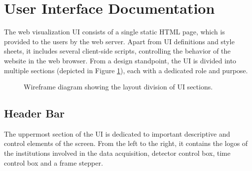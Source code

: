 \section{User Interface Documentation}
The web visualization UI consists of a single static HTML page, which is provided to the users by the web server. Apart from UI definitions and style sheets, it includes several client-side scripts, controlling the behavior of the website in the web browser. From a design standpoint, the UI is divided into multiple sections (depicted in Figure \ref{fig:wireframe}), each with a dedicated role and purpose.

\begin{figure}[t]
\begin{center}

\caption{Wireframe diagram showing the layout division of UI sections.}
\label{fig:wireframe}
\end{center}
\end{figure}

\subsection{Header Bar}
The uppermost section of the UI is dedicated to important descriptive and control elements of the screen. From the left to the right, it contains the logos of the institutions involved in the data acquisition, detector control box, time control box and a frame stepper.


